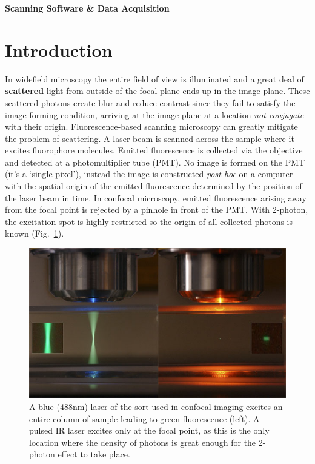 \documentclass[a4paper]{report}
\begin{document}
\setcounter{secnumdepth}{2}

\begin{center}
\textbf{\Large{Scanning Software \& Data Acquisition}}
\end{center}

\section{Introduction}

In widefield microscopy the entire field of view is illuminated and a great deal of \textbf{scattered} light from outside of the focal plane ends up in the image plane. 
These scattered photons create blur and reduce contrast since they fail to satisfy the image-forming condition, arriving at the image plane at a location \textit{not conjugate} with their origin.
Fluorescence-based scanning microscopy can greatly mitigate the problem of scattering. 
A laser beam is scanned across the sample where it excites fluorophore molecules. 
Emitted fluorescence is collected via the objective and detected at a photomultiplier tube (PMT). 
No image is formed on the PMT (it's a `single pixel'), instead the image is constructed \textit{post-hoc} on a computer with the spatial origin of the emitted fluorescence determined by the position of the laser beam in time.
In confocal microscopy, emitted fluorescence arising away from the focal point is rejected by a pinhole in front of the PMT. 
With 2-photon, the excitation spot is highly restricted so the origin of all collected photons is known (Fig.~\ref{1pvs2p}). 

\begin{figure}[h]
\centering
\includegraphics[width=4.5in]{1Pvs2PFluorescence.png}
\caption{A blue (488nm) laser of the sort used in confocal imaging excites an entire column of sample leading to green fluorescence (left).
A pulsed IR laser excites only at the focal point, as this is the only location where the density of photons is great enough for the 2-photon effect to take place.}
\label{1pvs2p}
\end{figure}
\end{document}
